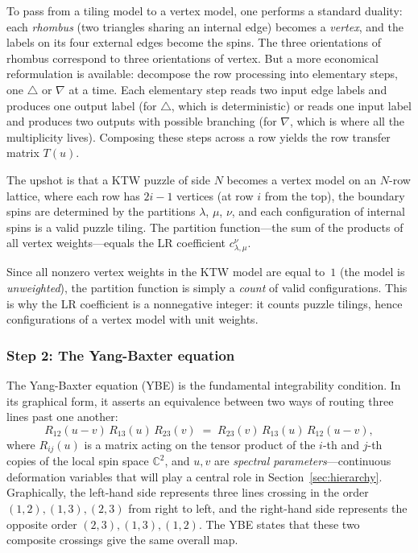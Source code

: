 To pass from a tiling model to a vertex model, one performs a standard
duality: each \emph{rhombus} (two triangles sharing an internal edge)
becomes a \emph{vertex}, and the labels on its four external edges
become the spins.  The three orientations of rhombus correspond to
three orientations of vertex.  But a more economical reformulation is
available: decompose the row processing into elementary steps, one
$\triangle$ or $\nabla$ at a time.  Each elementary step reads two
input edge labels and produces one output label (for $\triangle$,
which is deterministic) or reads one input label and produces two
outputs with possible branching (for $\nabla$, which is where all the
multiplicity lives).  Composing these steps across a row yields the
row transfer matrix $T(u)$.

The upshot is that a KTW puzzle of side $N$ becomes a vertex model on
an $N$-row lattice, where each row has $2i-1$ vertices (at row $i$
from the top), the boundary spins are determined by the partitions
$\lambda$, $\mu$, $\nu$, and each configuration of internal spins is
a valid puzzle tiling.  The partition function---the sum of the
products of all vertex weights---equals the LR coefficient
$c^{\nu}_{\lambda,\mu}$.

\begin{remark}
Since all nonzero vertex weights in the KTW model are equal to~$1$
(the model is \emph{unweighted}), the partition function is simply a
\emph{count} of valid configurations.  This is why the LR coefficient
is a nonneg\-ative integer: it counts puzzle tilings, hence
configurations of a vertex model with unit weights.
\end{remark}

\subsubsection*{Step 2: The Yang-Baxter equation}

The Yang-Baxter equation (YBE) is the fundamental integrability
condition.  In its graphical form, it asserts an equivalence between
two ways of routing three lines past one another:
\begin{equation}
\label{eq:ybe}
  R_{12}(u-v)\, R_{13}(u)\, R_{23}(v)
  \;=\;
  R_{23}(v)\, R_{13}(u)\, R_{12}(u-v),
\end{equation}
where $R_{ij}(u)$ is a matrix acting on the tensor product of the
$i$-th and $j$-th copies of the local spin space $\mathbb{C}^2$, and
$u, v$ are \emph{spectral parameters}---continuous deformation
variables that will play a central role in
Section~\ref{sec:hierarchy}.  Graphically, the left-hand side
represents three lines crossing in the order $(1,2), (1,3), (2,3)$
from right to left, and the right-hand side represents the opposite
order $(2,3), (1,3), (1,2)$.  The YBE states that these two composite
crossings give the same overall map.

